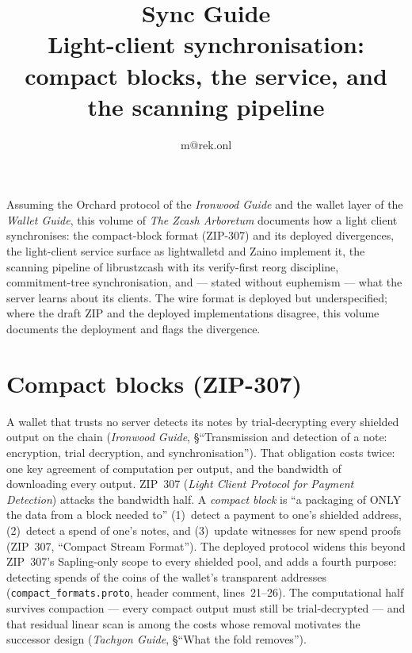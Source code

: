 \documentclass[11pt,a4paper]{article}
\title{\textbf{\Huge Sync Guide}\\[6pt]\large Light-client synchronisation: compact blocks, the service, and the scanning pipeline}
\author{m@rek.onl}
\date{}
\theoremstyle{definition}
\renewenvironment{abstract}{%
  \small\begin{center}{\bfseries\abstractname}\end{center}\medskip\noindent\ignorespaces
}{\par\medskip}
\begin{document}
\maketitle
\thispagestyle{empty}
\begin{abstract}
Assuming the Orchard protocol of the \emph{Ironwood Guide} and the wallet layer
of the \emph{Wallet Guide}, this volume of \emph{The Zcash Arboretum}
documents how a light client synchronises: the compact-block format (ZIP-307)
and its deployed divergences, the light-client service surface as lightwalletd
and Zaino implement it, the scanning pipeline of \textsf{librustzcash} with
its verify-first reorg discipline, commitment-tree synchronisation, and ---
stated without euphemism --- what the server learns about its clients. The
wire format is deployed but underspecified; where the draft ZIP and the
deployed implementations disagree, this volume documents the deployment and
flags the divergence.
\end{abstract}
\clearpage
\tableofcontents
\clearpage
\section{Compact blocks (ZIP-307)}\label{sec:sync-compact}

A wallet that trusts no server detects its notes by trial-decrypting every
shielded output on the chain (\emph{Ironwood Guide}, \S``Transmission and
detection of a note: encryption, trial decryption, and synchronisation'').
That obligation costs twice: one key agreement of computation per output, and
the bandwidth of downloading every output. ZIP~307 (\emph{Light Client
Protocol for Payment Detection}) attacks the bandwidth half. A \emph{compact
block} is ``a packaging of ONLY the data from a block needed to'' (1)~detect
a payment to one's shielded address, (2)~detect a spend of one's notes, and
(3)~update witnesses for new spend proofs (ZIP~307, ``Compact Stream
Format''). The deployed protocol widens this beyond ZIP~307's Sapling-only
scope to every shielded pool, and adds a fourth purpose: detecting spends of
the coins of the wallet's transparent addresses
(\texttt{compact\_formats.proto}, header comment, lines~21--26). The
computational half survives compaction --- every compact output must still be
trial-decrypted --- and that residual linear scan is among the costs whose
removal motivates the successor design (\emph{Tachyon Guide}, \S``What the
fold removes'').

\end{document}
